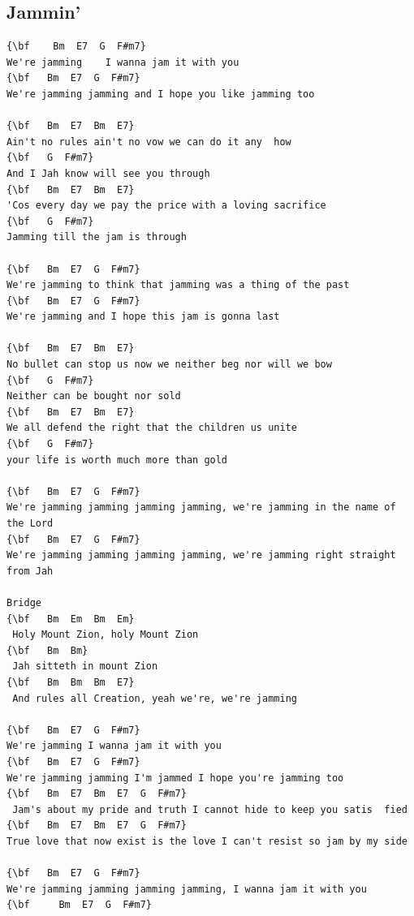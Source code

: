\documentclass[a4paper]{article}
\begin{document}
\subsection{Jammin'}
\begin{Verbatim}[commandchars=\\\{\}]
{\bf    Bm  E7  G  F#m7}
We're jamming    I wanna jam it with you   
{\bf   Bm  E7  G  F#m7}
We're jamming jamming and I hope you like jamming too   

{\bf   Bm  E7  Bm  E7}
Ain't no rules ain't no vow we can do it any  how  
{\bf   G  F#m7}
And I Jah know will see you through 
{\bf   Bm  E7  Bm  E7}
'Cos every day we pay the price with a loving sacrifice         
{\bf   G  F#m7}
Jamming till the jam is through  

{\bf   Bm  E7  G  F#m7}
We're jamming to think that jamming was a thing of the past
{\bf   Bm  E7  G  F#m7}
We're jamming and I hope this jam is gonna last

{\bf   Bm  E7  Bm  E7}
No bullet can stop us now we neither beg nor will we bow  
{\bf   G  F#m7}
Neither can be bought nor sold    
{\bf   Bm  E7  Bm  E7}
We all defend the right that the children us unite             
{\bf   G  F#m7}
your life is worth much more than gold

{\bf   Bm  E7  G  F#m7}
We're jamming jamming jamming jamming, we're jamming in the name of the Lord
{\bf   Bm  E7  G  F#m7}
We're jamming jamming jamming jamming, we're jamming right straight from Jah

Bridge
{\bf   Bm  Em  Bm  Em}
 Holy Mount Zion, holy Mount Zion
{\bf   Bm  Bm}
 Jah sitteth in mount Zion
{\bf   Bm  Bm  Bm  E7}
 And rules all Creation, yeah we're, we're jamming   

{\bf   Bm  E7  G  F#m7}
We're jamming I wanna jam it with you 
{\bf   Bm  E7  G  F#m7}
We're jamming jamming I'm jammed I hope you're jamming too 
{\bf   Bm  E7  Bm  E7  G  F#m7}
 Jam's about my pride and truth I cannot hide to keep you satis  fied    
{\bf   Bm  E7  Bm  E7  G  F#m7}
True love that now exist is the love I can't resist so jam by my side    

{\bf   Bm  E7  G  F#m7}
We're jamming jamming jamming jamming, I wanna jam it with you
{\bf     Bm  E7  G  F#m7}

\end{Verbatim}
\newpage
\end{document}
